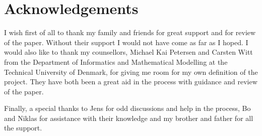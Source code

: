 
\begingroup
\let\clearpage\relax
\let\cleardoublepage\relax
\let\cleardoublepage\relax

\chapter*{Acknowledgements}

I wish first of all to thank my family and friends for great support and for review of the paper. Without their support I would not have come as far as I hoped. I would also like to thank my counsellors, Michael Kai Petersen and Carsten Witt from the Department of Informatics and Mathematical Modelling at the Technical University of Denmark, for giving me room for my own definition of the project. They have both been a great aid in the process with guidance and review of the paper.

Finally, a special thanks to Jens for odd discussions and help in the process, Bo and Niklas for assistance with their knowledge and my brother and father for all the support.

\endgroup



